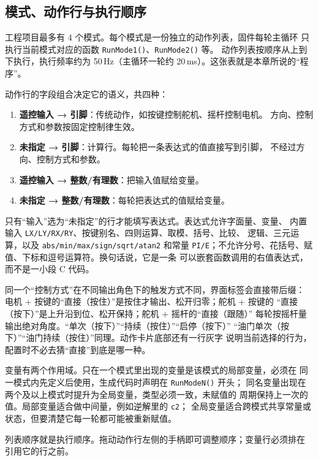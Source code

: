 \subsection{模式、动作行与执行顺序}

工程项目最多有 4 个模式。每个模式是一份独立的动作列表，固件每轮主循环
只执行当前模式对应的函数 \texttt{RunMode1()}、\texttt{RunMode2()} 等。
动作列表按顺序从上到下执行，执行频率约为 50\,Hz（主循环一轮约
20\,ms）。这张表就是本章所说的“程序”。

动作行的字段组合决定它的语义，共四种：

\begin{enumerate}
  \item \textbf{遥控输入 → 引脚}：传统动作，如按键控制舵机、摇杆控制电机。
        方向、控制方式和参数按固定控制律生效。
  \item \textbf{未指定 → 引脚}：计算行。每轮把一条表达式的值直接写到引脚，
        不经过方向、控制方式和参数。
  \item \textbf{遥控输入 → 整数/有理数}：把输入值赋给变量。
  \item \textbf{未指定 → 整数/有理数}：每轮把表达式的值赋给变量。
\end{enumerate}

只有“输入”选为“未指定”的行才能填写表达式。表达式允许字面量、变量、
内置输入 \texttt{LX/LY/RX/RY}、按键别名、四则运算、取模、括号、比较、
逻辑、三元运算，以及 \texttt{abs/min/max/sign/sqrt/atan2} 和常量
\texttt{PI/E}；不允许分号、花括号、赋值、下标和逗号运算符。换句话说，它是一条
可以嵌套函数调用的右值表达式，而不是一小段 C 代码。

同一个“控制方式”在不同输出角色下的触发方式不同，界面标签会直接带后缀：
电机 + 按键的“直接（按住）”是按住才输出、松开归零；舵机 + 按键的
“直接（按下）”是上升沿到位、松开保持；舵机 + 摇杆的“直接（跟随）”
每轮按摇杆量输出绝对角度。“单次（按下）”“持续（按住）”“启停（按下）”
“油门单次（按下）”“油门持续（按住）”同理。动作卡片底部还有一行灰字
说明当前选择的行为，配置时不必去猜“直接”到底是哪一种。

变量有两个作用域。只在一个模式里出现的变量是该模式的局部变量，必须在
同一模式内先定义后使用，生成代码时声明在 \texttt{RunModeN()} 开头；
同名变量出现在两个及以上模式时提升为全局变量，类型必须一致，未赋值的
周期保持上一次的值。局部变量适合做中间量，例如逆解里的 \texttt{c2}；
全局变量适合跨模式共享常量或状态，但要清楚它每一轮都可能被重新赋值。

\begin{note}
列表顺序就是执行顺序。拖动动作行左侧的手柄即可调整顺序；变量行必须排在
引用它的行之前。
\end{note}


